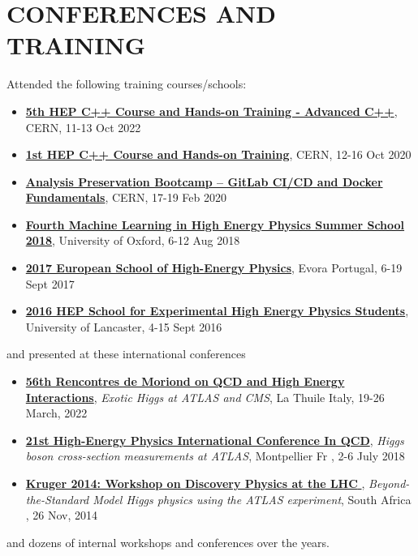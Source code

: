 \documentclass[11 pt,oneside,a4paper,titlepage]{article}
\begin{document}
{\begin{minipage}{13.3cm}
    \section*{{\faComments} CONFERENCES AND TRAINING}
    \footnotesize Attended the following training courses/schools: 
    \begin{itemize}
        \footnotesize
         \item{\href{https://indico.cern.ch/event/1172498/timetable/?view=standard}{\textbf{5th HEP C++ Course and Hands-on Training - Advanced C++}}, CERN, 11-13 Oct 2022}
         \item{\href{https://indico.cern.ch/event/946584/timetable/?view=standard}{\textbf{1st HEP C++ Course and Hands-on Training}}, CERN, 12-16 Oct 2020}
         \item{\href{https://indico.cern.ch/event/854880/timetable/?view=standard}{\textbf{Analysis Preservation Bootcamp -- GitLab CI/CD and Docker Fundamentals}}, CERN, 17-19 Feb 2020}
         \item{\href{https://indico.cern.ch/event/687473/timetable/?view=standard}{\textbf{Fourth Machine Learning in High Energy Physics Summer School 2018}}, University of Oxford, 6-12 Aug 2018 }
         \item{\href{https://indico.cern.ch/event/614672/timetable/?view=standard}{\textbf{2017 European School of High-Energy Physics}}, Evora Portugal, 6-19 Sept 2017}
         \item{\href{https://indico.cern.ch/event/558879/}{\textbf{2016 HEP School for Experimental High Energy Physics Students}}, University of Lancaster, 4-15 Sept 2016}
    \end{itemize}
    and presented at these international conferences
    \begin{itemize}
    \item \href{https://moriond.in2p3.fr/2022/QCD/Program.html}{\textbf{56th Rencontres de Moriond on QCD and High Energy Interactions}}, \emph{Exotic Higgs at ATLAS and CMS}, La Thuile Italy, 19-26 March, 2022 
    \item \href{https://indico.cern.ch/event/736911/}{\textbf{21st High-Energy Physics International Conference In QCD}}, \emph{Higgs boson cross-section measurements at ATLAS}, Montpellier Fr , 2-6 July 2018 
    \item \href{https://indico.cern.ch/event/352528/}{\textbf{ Kruger 2014: Workshop on Discovery Physics at the LHC }}, \emph{Beyond-the-Standard Model Higgs physics using the ATLAS experiment}, South Africa , 26 Nov, 2014 
    \end{itemize}
     and dozens of internal workshops and conferences over the years.
    

\end{minipage}}
\end{document}

